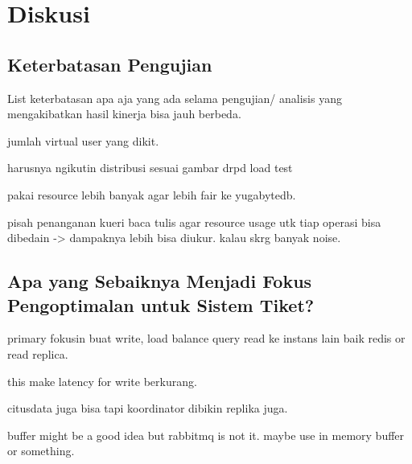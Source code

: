 \section{Diskusi}

\subsection{Keterbatasan Pengujian}

List keterbatasan apa aja yang ada selama pengujian/ analisis yang mengakibatkan hasil kinerja bisa jauh berbeda.

jumlah virtual user yang dikit.

harusnya ngikutin distribusi sesuai gambar drpd load test

pakai resource lebih banyak agar lebih fair ke yugabytedb.

pisah penanganan kueri baca tulis agar resource usage utk tiap operasi bisa dibedain -> dampaknya lebih bisa diukur. kalau skrg banyak noise.

\subsection{Apa yang Sebaiknya Menjadi Fokus Pengoptimalan untuk Sistem Tiket?}

primary fokusin buat write, load balance query read ke instans lain baik redis or read replica.

this make latency for write berkurang.

citusdata juga bisa tapi koordinator dibikin replika juga.

buffer might be a good idea but rabbitmq is not it. maybe use in memory buffer or something.